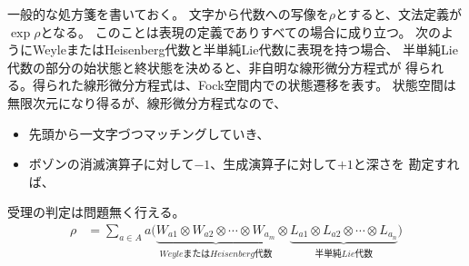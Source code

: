 		一般的な処方箋を書いておく。
		文字から代数への写像を$\rho$とすると、文法定義が$\exp\rho$となる。
		このことは表現の定義でありすべての場合に成り立つ。
		次のようにWeyleまたはHeisenberg代数と半単純Lie代数に表現を持つ場合、
		半単純Lie代数の部分の始状態と終状態を決めると、非自明な線形微分方程式が
		得られる。得られた線形微分方程式は、Fock空間内での状態遷移を表す。
		状態空間は無限次元になり得るが、線形微分方程式なので、
		\begin{itemize}\setlength{\itemsep}{-1mm} %
			\item 先頭から一文字づつマッチングしていき、
			\item ボゾンの消滅演算子に対して$-1$、生成演算子に対して$+1$と深さを
			勘定すれば、
		\end{itemize} %
		受理の判定は問題無く行える。
		\begin{equation*}\begin{split} %
			\rho &= \sum_{a\in A}a\biggl(
				\underbrace{W_{a1}\otimes W_{a2}\otimes\cdots\otimes W_{a_m}}
				_{WeyleまたはHeisenberg代数}
				\otimes\underbrace{L_{a1}\otimes L_{a2}\otimes\cdots\otimes L_{a_n}}
				_{半単純Lie代数}
				\biggr)
		\end{split}\end{equation*} %

